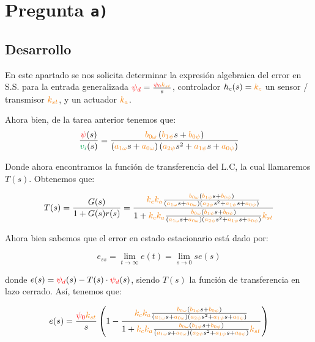\section{Pregunta \texttt{a)}}\label{pregunta-a}

\subsection{Desarrollo}

En este apartado se nos solicita determinar la expresión algebraica del error en
S.S. para la entrada generalizada \( \rojo{\psi_d} = \frac{\rojo{\psi_0}\nara{k_{st}}}{s} \),
controlador \(h_{c}(s)=\nara{k_c}\) un sensor / transmisor \(\nara{k_{st}}\),
y un actuador \(\nara{k_{a}}\). 

Ahora bien, de la tarea anterior tenemos que:
\begin{equation}
  \frac{\rojo{\psi}(s)}{\verd{v_i}(s)} =
  \frac{\nara{\nara{b_{0\omega}}}\left(\nara{b_{1\psi}}s + \nara{b_{0\psi}}\right)}
  {\left(\nara{a_{1\omega}}s + \nara{a_{0\omega}}\right)\left(\nara{a_{2\psi}}s^{2} + \nara{a_{1\psi}}s + \nara{a_{0\psi}}\right)}
\end{equation}

Donde ahora encontramos la función de transferencia del L.C, la cual llamaremos
\(T(s)\). Obtenemos que:

\begin{equation}
  T(s) = \frac{G(s)}{1 + G(s)r(s)} = \dfrac{\nara{k_ck_a} \frac{\nara{\nara{b_{0\omega}}}\left(\nara{b_{1\psi}}s + \nara{b_{0\psi}}\right)}
  {\left(\nara{a_{1\omega}}s + \nara{a_{0\omega}}\right)\left(\nara{a_{2\psi}}s^{2} + \nara{a_{1\psi}}s + \nara{a_{0\psi}}\right)}}{1+\nara{k_ck_a} \frac{\nara{\nara{b_{0\omega}}}\left(\nara{b_{1\psi}}s + \nara{b_{0\psi}}\right)}
  {\left(\nara{a_{1\omega}}s + \nara{a_{0\omega}}\right)\left(\nara{a_{2\psi}}s^{2} + \nara{a_{1\psi}}s + \nara{a_{0\psi}}\right)}\nara{k_{st}}}
\end{equation}


Ahora bien sabemos que el error en estado estacionario está dado por:

\begin{equation}
  e_{ss} = \lim_{t \to \infty} e(t) = \lim_{s \to 0} s e(s)
\end{equation}


donde \( e(s) = \mathbin{\color{red}\psi_d}(s) - T(s) \cdot \mathbin{\color{red}\psi_d}(s) \), siendo \( T(s) \) la función de transferencia en lazo cerrado. Así, tenemos que:

\begin{equation}
  e(s) = \frac{\rojo{\psi_0}\nara{k_{st}}}{s} \left( 1 - \dfrac{\nara{k_ck_a} \frac{\nara{\nara{b_{0\omega}}}\left(\nara{b_{1\psi}}s + \nara{b_{0\psi}}\right)}
{\left(\nara{a_{1\omega}}s + \nara{a_{0\omega}}\right)\left(\nara{a_{2\psi}}s^{2} + \nara{a_{1\psi}}s + \nara{a_{0\psi}}\right)}}{1+\nara{k_ck_a} \frac{\nara{\nara{b_{0\omega}}}\left(\nara{b_{1\psi}}s + \nara{b_{0\psi}}\right)}
{\left(\nara{a_{1\omega}}s + \nara{a_{0\omega}}\right)\left(\nara{a_{2\psi}}s^{2} + \nara{a_{1\psi}}s + \nara{a_{0\psi}}\right)}\nara{k_{st}}} \right)
\end{equation}


